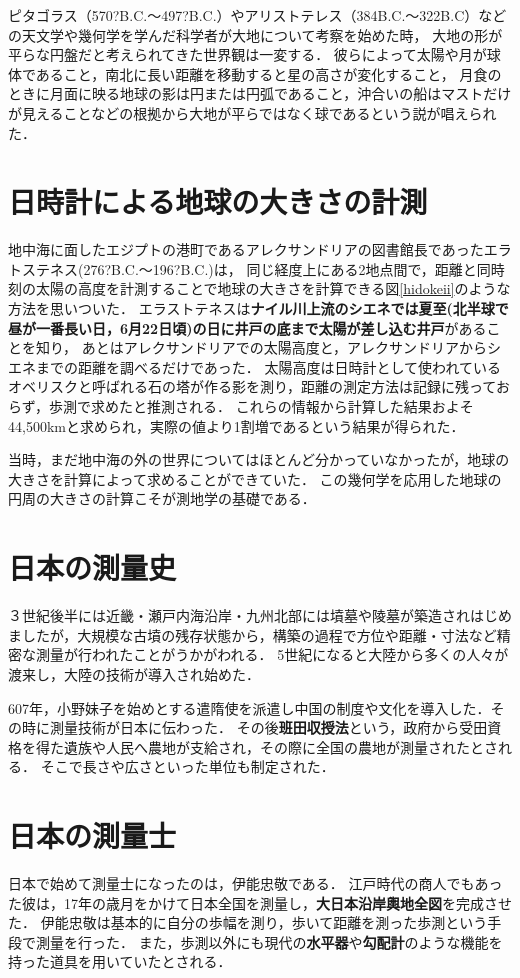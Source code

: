 \documentclass[titlepage,a4paper]{jsarticle}
\begin{document}
ピタゴラス（570?B.C.～497?B.C.）やアリストテレス（384B.C.～322B.C）などの天文学や幾何学を学んだ科学者が大地について考察を始めた時，
大地の形が平らな円盤だと考えられてきた世界観は一変する．
彼らによって太陽や月が球体であること，南北に長い距離を移動すると星の高さが変化すること，
月食のときに月面に映る地球の影は円または円弧であること，沖合いの船はマストだけが見えることなどの根拠から大地が平らではなく球であるという説が唱えられた．

\section{日時計による地球の大きさの計測}
地中海に面したエジプトの港町であるアレクサンドリアの図書館長であったエラトステネス(276?B.C.～196?B.C.)は，
同じ経度上にある2地点間で，距離と同時刻の太陽の高度を計測することで地球の大きさを計算できる図\ref{hidokeii}のような方法を思いついた．
エラストテネスは\textbf{ナイル川上流のシエネでは夏至(北半球で昼が一番長い日，6月22日頃)の日に井戸の底まで太陽が差し込む井戸}があることを知り，
あとはアレクサンドリアでの太陽高度と，アレクサンドリアからシエネまでの距離を調べるだけであった．
太陽高度は日時計として使われているオベリスクと呼ばれる石の塔が作る影を測り，距離の測定方法は記録に残っておらず，歩測で求めたと推測される．
これらの情報から計算した結果およそ44,500kmと求められ，実際の値より1割増であるという結果が得られた．

当時，まだ地中海の外の世界についてはほとんど分かっていなかったが，地球の大きさを計算によって求めることができていた．
この幾何学を応用した地球の円周の大きさの計算こそが測地学の基礎である．

\section{日本の測量史}
３世紀後半には近畿・瀬戸内海沿岸・九州北部には墳墓や陵墓が築造されはじめましたが，大規模な古墳の残存状態から，構築の過程で方位や距離・寸法など精密な測量が行われたことがうかがわれる．
5世紀になると大陸から多くの人々が渡来し，大陸の技術が導入され始めた．

607年，小野妹子を始めとする遣隋使を派遣し中国の制度や文化を導入した．その時に測量技術が日本に伝わった．
その後\textbf{班田収授法}という，政府から受田資格を得た遺族や人民へ農地が支給され，その際に全国の農地が測量されたとされる．
そこで長さや広さといった単位も制定された．

\section{日本の測量士}
日本で始めて測量士になったのは，伊能忠敬である．
江戸時代の商人でもあった彼は，17年の歳月をかけて日本全国を測量し，\textbf{大日本沿岸輿地全図}を完成させた．
伊能忠敬は基本的に自分の歩幅を測り，歩いて距離を測った歩測という手段で測量を行った．
また，歩測以外にも現代の\textbf{水平器}や\textbf{勾配計}のような機能を持った道具を用いていたとされる．
\end{document}
